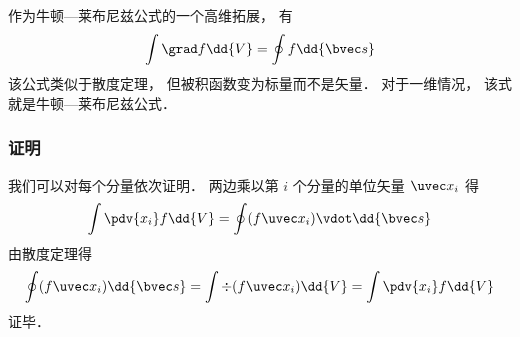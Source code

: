 

作为牛顿—莱布尼兹公式的一个高维拓展， 有
\begin{equation}\label{NLext_eq3}
\int \grad f \dd{V} = \oint f \dd{\bvec s}
\end{equation}
该公式类似于散度定理， 但被积函数变为标量而不是矢量． 对于一维情况， 该式就是牛顿—莱布尼兹公式．

\subsubsection{证明}
我们可以对每个分量依次证明． 两边乘以第 $i$ 个分量的单位矢量 $\uvec x_i$ 得
\begin{equation}
\int \pdv{x_i}f \dd{V} = \oint (f\uvec x_i) \vdot \dd{\bvec s}
\end{equation}
由散度定理得
\begin{equation}
\oint (f\uvec x_i) \dd{\bvec s} = \int \div (f\uvec x_i) \dd{V} = \int \pdv{x_i} f \dd{V}
\end{equation}
证毕．
